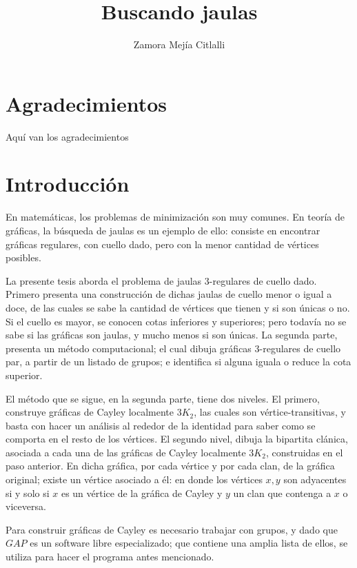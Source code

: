 \documentclass[11pt]{book}
\theoremstyle{definition}
\begin{document}
\title{Buscando jaulas} \author{Zamora Mejía Citlalli} \date{}
\maketitle


\newpage \thispagestyle{empty}
\chapter*{Agradecimientos}
Aquí van los agradecimientos



\newpage \thispagestyle{empty}




\chapter{Introducción}

En matemáticas, los problemas de minimización son muy comunes.
En teoría de gráficas, la búsqueda de jaulas es un ejemplo de
ello: consiste en encontrar gráficas regulares, con cuello dado,
pero con la menor cantidad de vértices posibles.


La presente tesis aborda el problema de jaulas 3-regulares de
cuello dado. Primero presenta una construcción de dichas jaulas de
cuello menor o igual a doce, de las cuales se sabe la
cantidad de vértices que tienen y si son únicas o no. Si el cuello
es mayor, se conocen cotas inferiores y superiores; pero todavía
no se sabe si las gráficas son jaulas, y mucho menos si son
únicas.  La segunda parte, presenta un método computacional; el
cual dibuja gráficas $3$-regulares de cuello par, a partir de un
listado de grupos; e identifica si alguna iguala o reduce la cota
superior.


El método que se sigue, en la segunda parte, tiene dos niveles. El
primero, construye gráficas de Cayley localmente $3K_2$, las
cuales son vértice-transitivas, y basta con hacer un análisis al
rededor de la identidad para saber como se comporta en el resto de
los vértices. El segundo nivel, dibuja la bipartita clánica,
asociada a cada una de las gráficas de Cayley localmente $3K_2$,
construidas en el paso anterior. En dicha gráfica, por cada
vértice y por cada clan, de la gráfica original; existe un vértice
asociado a \'el: en donde los vértices $x,y$ son adyacentes si y
solo si $x$ es un vértice de la gráfica de Cayley y $y$ un clan
que contenga a $x$ o viceversa.

Para construir gráficas de Cayley es necesario trabajar con
grupos, y dado que $GAP$ es un software libre especializado; que
contiene una amplia lista de ellos, se utiliza para hacer el
programa antes mencionado.
\end{document}
